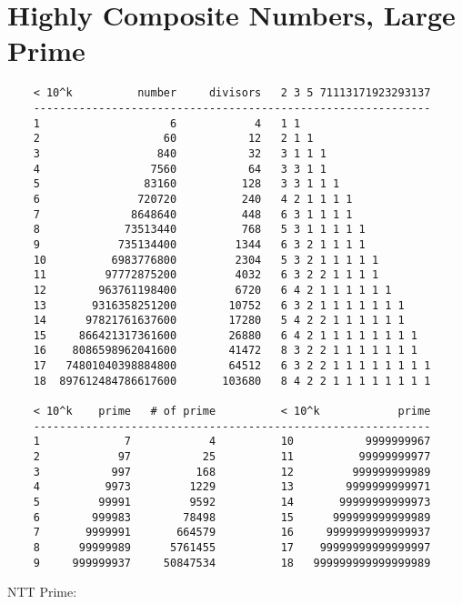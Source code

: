\let\le=\leqslant
\let\ge=\geqslant
 
\setlength{\parindent}{0pt}
\setlength{\parskip}{3mm}
\pagestyle{fancy}
\renewcommand{\headrulewidth}{0pt}
\renewcommand{\footrulewidth}{0pt}
 
\newcommand{\Section}[1]{
 \section*{#1}
 \addcontentsline{toc}{subsection}{#1}
 \vspace{-3mm}
}
 
 

\section {Highly Composite Numbers, Large Prime}
\begin{verbatim}
	< 10^k          number     divisors   2 3 5 71113171923293137
	-------------------------------------------------------------
	1                    6            4   1 1
	2                   60           12   2 1 1
	3                  840           32   3 1 1 1
	4                 7560           64   3 3 1 1
	5                83160          128   3 3 1 1 1
	6               720720          240   4 2 1 1 1 1
	7              8648640          448   6 3 1 1 1 1
	8             73513440          768   5 3 1 1 1 1 1
	9            735134400         1344   6 3 2 1 1 1 1
	10          6983776800         2304   5 3 2 1 1 1 1 1
	11         97772875200         4032   6 3 2 2 1 1 1 1
	12        963761198400         6720   6 4 2 1 1 1 1 1 1
	13       9316358251200        10752   6 3 2 1 1 1 1 1 1 1
	14      97821761637600        17280   5 4 2 2 1 1 1 1 1 1
	15     866421317361600        26880   6 4 2 1 1 1 1 1 1 1 1
	16    8086598962041600        41472   8 3 2 2 1 1 1 1 1 1 1
	17   74801040398884800        64512   6 3 2 2 1 1 1 1 1 1 1 1
	18  897612484786617600       103680   8 4 2 2 1 1 1 1 1 1 1 1

	< 10^k    prime   # of prime          < 10^k            prime
	-------------------------------------------------------------
	1             7            4          10           9999999967
	2            97           25          11          99999999977
	3           997          168          12         999999999989
	4          9973         1229          13        9999999999971
	5         99991         9592          14       99999999999973
	6        999983        78498          15      999999999999989
	7       9999991       664579          16     9999999999999937
	8      99999989      5761455          17    99999999999999997
	9     999999937     50847534          18   999999999999999989
\end{verbatim}
NTT Prime:

